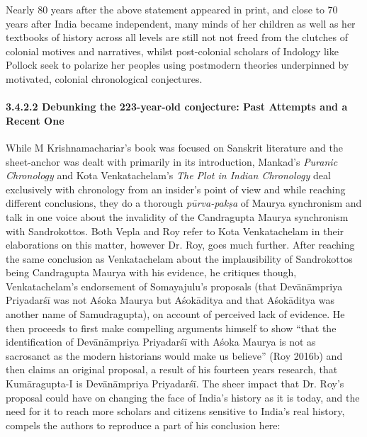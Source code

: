 Nearly 80 years after the above statement appeared in print, and close to 70 years after India became independent, many minds of her children as well as her textbooks of history across all levels are still not not freed from the clutches of colonial motives and narratives, whilst post-colonial scholars of Indology like Pollock seek to polarize her peoples using postmodern theories underpinned by motivated, colonial chronological conjectures.


\paragraph*{3.4.2.2 Debunking the 223-year-old conjecture: \hfill\break Past Attempts and a Recent One}

While M Krishnamachariar’s book was focused on Sanskrit literature and the sheet-anchor was dealt with primarily in its introduction, Mankad’s \textit{Puranic Chronology} and Kota Venkatachelam’s \textit{The Plot in Indian Chronology} deal exclusively with chronology from an insider’s point of view and while reaching different conclusions, they do a thorough \textit{pūrva-pakṣa} of Maurya synchronism and talk in one voice about the invalidity of the Candragupta Maurya synchronism with Sandrokottos. Both Vepla and Roy refer to Kota Venkatachelam in their elaborations on this matter, however Dr. Roy, goes much further. After reaching the same conclusion as Venkatachelam about the implausibility of Sandrokottos being Candragupta Maurya with his evidence, he critiques though, Venkatachelam’s endorsement of Somayajulu’s proposals (that Devānāmpriya Priyadarśī was not Aśoka Maurya but Aśokāditya and that Aśokāditya was another name of Samudragupta), on account of perceived lack of evidence. He then proceeds to first make compelling arguments himself to show “that the identification of Devānāmpriya Priyadarśī with Aśoka Maurya is not as sacrosanct as the modern historians would make us believe” (Roy 2016b) and then claims an original proposal, a result of his fourteen years research, that Kumāragupta-I is Devānāmpriya Priyadarśī. The sheer impact that Dr. Roy's proposal could have on changing the face of India’s history as it is today, and the need for it to reach more scholars and citizens sensitive to India’s real history, compels the authors to reproduce a part of his conclusion here:

